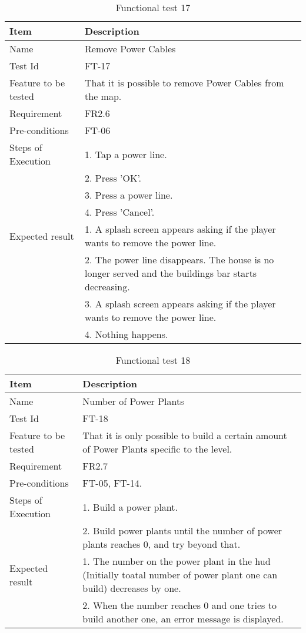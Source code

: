 \begin{table}[H]
\centering
	\begin{tabular}{ l | p{8cm} }
		\hline
		{\bf Item} & {\bf Description} \\ \hline
		Name & Remove Power Cables \\ 
		Test Id & FT-17 \\ 
		Feature to be tested & That it is possible to remove Power Cables from the map. \\ 
		Requirement & FR2.6 \\ 
		Pre-conditions & FT-06 \\ 
		Steps of Execution & 1. Tap a power line.  \\ 
		& 2. Press 'OK'. \\
		& 3. Press a power line. \\
		& 4. Press 'Cancel'. \\
		Expected result & 1. A splash screen appears asking if the player wants to remove the power line. \\ 
		& 2. The power line disappears. The house is no longer served and the buildings bar starts decreasing. \\
		& 3. A splash screen appears asking if the player wants to remove the power line. \\
		& 4. Nothing happens. \\
	\end{tabular}
	\caption{Functional test 17}
\end{table}

\begin{table}[H]
\centering
	\begin{tabular}{ l | p{8cm} }
		\hline
		{\bf Item} & {\bf Description} \\ \hline
		Name & Number of Power Plants \\ 
		Test Id & FT-18 \\ 
		Feature to be tested & That it is only possible to build a certain amount of Power Plants specific to the level. \\ 
		Requirement & FR2.7 \\ 
		Pre-conditions & FT-05, FT-14. \\ 
		Steps of Execution & 1. Build a power plant. \\ 
		& 2. Build power plants until the number of power plants reaches 0, and try beyond that. \\
		Expected result & 1. The number on the power plant in the hud (Initially toatal number of power plant one can build) decreases by one. \\
		& 2. When the number reaches 0 and one tries to build another one, an error message is displayed. \\
	\end{tabular}
	\caption{Functional test 18}
\end{table}

